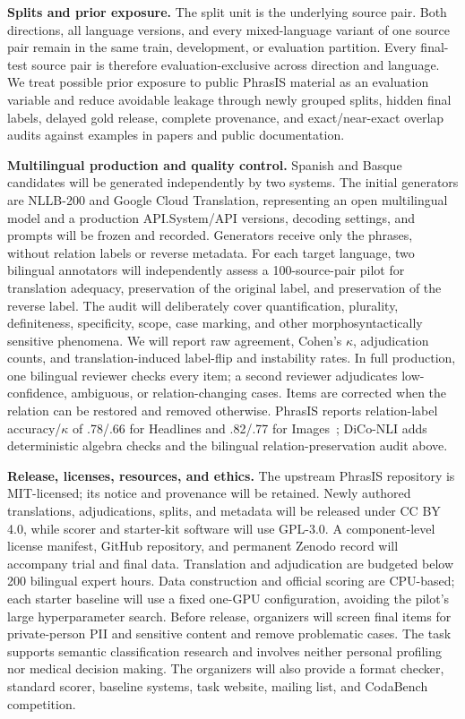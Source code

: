 \documentclass[11pt]{article}
\newif\ifshowrevisions
\newcommand{\rev}[1]{\ifshowrevisions{\color{revisionblue}#1}\else#1\fi}
\begin{document}
\rev{\textbf{Splits and prior exposure.}
The split unit is the underlying source pair. Both directions, all language versions, and every mixed-language variant of one source pair remain in the same train, development, or evaluation partition. Every final-test source pair is therefore evaluation-exclusive across direction and language. We treat possible prior exposure to public PhrasIS material as an evaluation variable and reduce avoidable leakage through newly grouped splits, hidden final labels, delayed gold release, complete provenance, and exact/near-exact overlap audits against examples in papers and public documentation.}

\rev{\textbf{Multilingual production and quality control.}
Spanish and Basque candidates will be generated independently by two systems. The initial generators are NLLB-200 and Google Cloud Translation, representing an open multilingual model and a production API.\@ System/API versions, decoding settings, and prompts will be frozen and recorded. Generators receive only the phrases, without relation labels or reverse metadata. For each target language, two bilingual annotators will independently assess a 100-source-pair pilot for translation adequacy, preservation of the original label, and preservation of the reverse label. The audit will deliberately cover quantification, plurality, definiteness, specificity, scope, case marking, and other morphosyntactically sensitive phenomena. We will report raw agreement, Cohen's $\kappa$, adjudication counts, and translation-induced label-flip and instability rates. In full production, one bilingual reviewer checks every item; a second reviewer adjudicates low-confidence, ambiguous, or relation-changing cases. Items are corrected when the relation can be restored and removed otherwise.}
PhrasIS reports relation-label accuracy/$\kappa$ of .78/.66 for Headlines and .82/.77 for Images~\cite{lopezgazpio2024phrasis}; DiCo-NLI adds deterministic algebra checks and the bilingual relation-preservation audit above.

\rev{\textbf{Release, licenses, resources, and ethics.}
The upstream PhrasIS repository is MIT-licensed; its notice and provenance will be retained. Newly authored translations, adjudications, splits, and metadata will be released under CC BY 4.0, while scorer and starter-kit software will use GPL-3.0. A component-level license manifest, GitHub repository, and permanent Zenodo record will accompany trial and final data. Translation and adjudication are budgeted below 200 bilingual expert hours. Data construction and official scoring are CPU-based; each starter baseline will use a fixed one-GPU configuration, avoiding the pilot's large hyperparameter search. Before release, organizers will screen final items for private-person PII and sensitive content and remove problematic cases. The task supports semantic classification research and involves neither personal profiling nor medical decision making.}
The organizers will also provide a format checker, standard scorer, baseline systems, task website, mailing list, and CodaBench competition.
\end{document}
